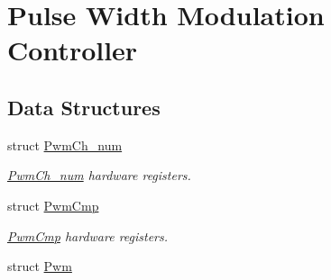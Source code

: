 \hypertarget{group__SAMV71__PWM}{}\section{Pulse Width Modulation Controller}
\label{group__SAMV71__PWM}
\subsection*{Data Structures}
\begin{DoxyCompactItemize}
\item 
struct \mbox{\hyperlink{structPwmCh__num}{Pwm\+Ch\+\_\+num}}
\begin{DoxyCompactList}\small\item\em \mbox{\hyperlink{structPwmCh__num}{Pwm\+Ch\+\_\+num}} hardware registers. \end{DoxyCompactList}\item 
struct \mbox{\hyperlink{structPwmCmp}{Pwm\+Cmp}}
\begin{DoxyCompactList}\small\item\em \mbox{\hyperlink{structPwmCmp}{Pwm\+Cmp}} hardware registers. \end{DoxyCompactList}\item 
struct \mbox{\hyperlink{structPwm}{Pwm}}
\end{DoxyCompactItemize}
